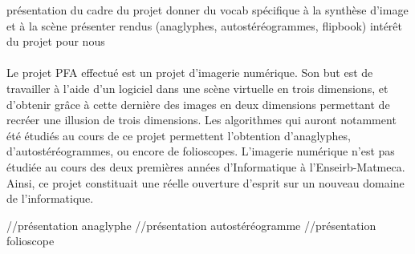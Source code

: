 présentation du cadre du projet
donner du vocab spécifique à la synthèse d'image et à la scène
présenter rendus (anaglyphes, autostéréogrammes, flipbook)
intérêt du projet pour nous

\paragraph{}
        Le projet PFA effectué est un projet d'imagerie numérique. Son but est de travailler à l'aide d'un logiciel dans une scène virtuelle en trois dimensions, et d'obtenir grâce à cette dernière des images en deux dimensions permettant de recréer une illusion de trois dimensions. Les algorithmes qui auront notamment été étudiés au cours de ce projet permettent l'obtention d'anaglyphes, d'autostéréogrammes, ou encore de folioscopes.
        L'imagerie numérique n'est pas étudiée au cours des deux premières années d'Informatique à l'Enseirb-Matmeca. Ainsi, ce projet constituait une réelle ouverture d'esprit sur un nouveau domaine de l'informatique.
        

//présentation anaglyphe
//présentation autostéréogramme
//présentation folioscope
